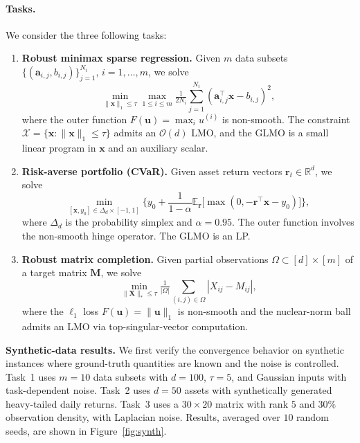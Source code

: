\documentclass{article}
\newcommand{\cX}{\mathcal{X}}
\def\va{{\bm{a}}}
\def\vr{{\bm{r}}}
\def\vu{{\bm{u}}}
\def\vx{{\bm{x}}}
\def\mM{{\bm{M}}}
\def\mX{{\bm{X}}}
\newcommand{\E}{\mathbb{E}}
\newcommand{\R}{\mathbb{R}}
\begin{document}
\paragraph{Tasks.}
We consider the three following tasks:
\begin{enumerate}[label=\textbf{Task \arabic*:}, leftmargin=*,noitemsep,topsep=0pt]
    \item \textbf{Robust minimax sparse regression.} Given $m$ data subsets $\{(\va_{i,j}, b_{i,j})\}_{j=1}^{N_i}$, $i = 1, \ldots, m$, we solve
    \begin{equation}
        \min_{\|\vx\|_1 \le \tau} \max_{1 \le i \le m} \tfrac{1}{2 N_i} \sum_{j=1}^{N_i} (\va_{i,j}^\top \vx - b_{i,j})^2,
    \end{equation}
    where the outer function $F(\vu) = \max_i u^{(i)}$ is non-smooth. The constraint $\cX = \{\vx : \|\vx\|_1 \le \tau\}$ admits an $\mathcal{O}(d)$ LMO, and the GLMO is a small linear program in $\vx$ and an auxiliary scalar.

    \item \textbf{Risk-averse portfolio (CVaR).} Given asset return vectors $\vr_t \in \R^d$, we solve
    \begin{equation}
        \min_{[\vx, y_0] \in \Delta_d \times [-1, 1]} \Big\{ y_0 + \frac{1}{1 - \alpha} \E_{\vr}\big[\max(0, -\vr^\top \vx - y_0)\big] \Big\},
    \end{equation}
    where $\Delta_d$ is the probability simplex and $\alpha = 0.95$. The outer function involves the non-smooth hinge operator. The GLMO is an LP.

    \item \textbf{Robust matrix completion.} Given partial observations $\Omega \subset [d] \times [m]$ of a target matrix $\mM$, we solve
    \begin{equation}
        \min_{\|\mX\|_* \le \tau} \tfrac{1}{|\Omega|} \sum_{(i,j) \in \Omega} |X_{ij} - M_{ij}|,
    \end{equation}
    where the $\ell_1$ loss $F(\vu) = \|\vu\|_1$ is non-smooth and the nuclear-norm ball admits an LMO via top-singular-vector computation.
\end{enumerate}

\textbf{Synthetic-data results.}
We first verify the convergence behavior on synthetic instances where ground-truth quantities are known and the noise is controlled. Task~1 uses $m = 10$ data subsets with $d = 100$, $\tau = 5$, and Gaussian inputs with task-dependent noise. Task~2 uses $d = 50$ assets with synthetically generated heavy-tailed daily returns. Task~3 uses a $30 \times 20$ matrix with rank $5$ and $30\%$ observation density, with Laplacian noise. Results, averaged over $10$ random seeds, are shown in Figure~\ref{fig:synth}.
\end{document}
